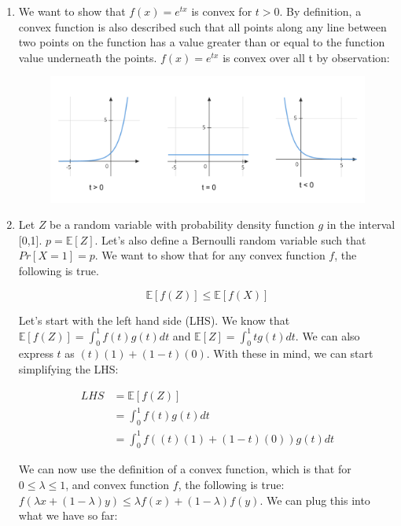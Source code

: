 \documentclass[11pt]{article}
\theoremstyle{definition}
\theoremstyle{case}
\theoremstyle{theorem}
\begin{document}
\begin{enumerate}[label=(\alph*)]

\item We want to show that $f(x) = e^{tx}$ is convex for $t > 0$. By definition, a convex function
is also described such that all points along any line between two points on the function has a value greater than
or equal to the function value underneath the points. $f(x) = e^{tx}$ is convex over all t by
observation:

\begin{figure}[h!]
  \centering
  \includegraphics[totalheight=6cm]{images/convex.png}
\end{figure}

\item Let $Z$ be a random variable with probability density function $g$ in the interval [0,1]. $p = \mathbb{E}[Z]$. 
Let's also define a Bernoulli random variable such that $Pr[X = 1] = p$. We want to show that for any convex
function $f$, the following is true.

\[
  \mathbb{E}[f(Z)] \leq \mathbb{E}[f(X)]
\] 

Let's start with the left hand side (LHS). We know that $\mathbb{E}[f(Z)] = \int_0^1 f(t) g(t) dt$ and $\mathbb{E}[Z] = \int_0^1 t g(t) dt$.
We can also express $t$ as $(t)(1) + (1 - t)(0)$. With these in mind, we can start simplifying the LHS:

\begin{align*}
  LHS &= \mathbb{E}[f(Z)] \\
      &= \int_0^1 f(t) g(t) dt \\
      &= \int_0^1 f( (t)(1) + (1 - t)(0)) g(t) dt 
\end{align*}

We can now use the definition of a convex function, which is that for $0 \leq \lambda \leq 1$, and convex
function $f$, the following is true: $f(\lambda x + (1 - \lambda)y) \leq \lambda f(x) + (1 - \lambda)f(y)$.
We can plug this into what we have so far:


\end{enumerate}
\end{document}

